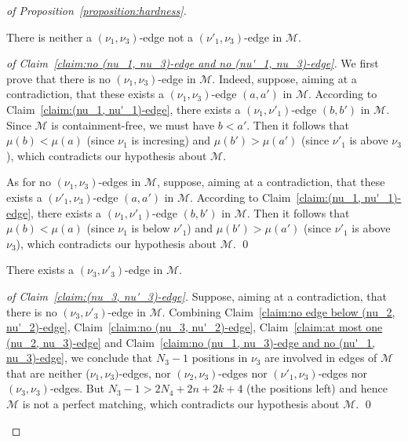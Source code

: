 \documentclass[a4paper]{llncs}
\begin{document}
\begin{proof}[of Proposition~\ref{proposition:hardness}]
  \begin{claim}
    \label{claim:no (nu_1, nu_3)-edge and no (nu'_1, nu_3)-edge}
    There is neither a $(\nu_1, \nu_3)$-edge not a $(\nu'_1, \nu_3)$-edge
    in $\mathcal{M}$.
  \end{claim}

 \begin{proof}[of Claim~\ref{claim:no (nu_1, nu_3)-edge and no (nu'_1, nu_3)-edge}]
    We first prove that there is no $(\nu_1, \nu_3)$-edge in $\mathcal{M}$.
    Indeed, suppose, aiming at a contradiction, that these exists
    a $(\nu_1, \nu_3)$-edge $(a, a')$ in $\mathcal{M}$.
    According to Claim~\ref{claim:(nu_1, nu'_1)-edge},
    there exists a $(\nu_1, \nu'_1)$-edge $(b, b')$ in $\mathcal{M}$.
    Since $\mathcal{M}$ is containment-free, we must have
    $b < a'$.
    Then it follows that
    $\mu(b) < \mu(a)$ (since $\nu_1$ is incresing) and
    $\mu(b') > \mu(a')$ (since $\nu'_1$ is above $\nu_3$),
    which contradicts our hypothesis about $\mathcal{M}$.

    As for no $(\nu_1, \nu_3)$-edges in $\mathcal{M}$, suppose,
    aiming at a contradiction, that these exists
    a $(\nu'_1, \nu_3)$-edge $(a, a')$ in $\mathcal{M}$.
    According to Claim~\ref{claim:(nu_1, nu'_1)-edge},
    there exists a $(\nu_1, \nu'_1)$-edge $(b, b')$ in $\mathcal{M}$.
    Then it follows that
    $\mu(b) < \mu(a)$ (since $\nu_1$ is below $\nu'_1$) and
    $\mu(b') > \mu(a')$ (since $\nu'_1$ is above $\nu_3$),
    which contradicts our hypothesis about $\mathcal{M}$.
    \qed
  \end{proof}

  \begin{claim}
    \label{claim:(nu_3, nu'_3)-edge}
    There exists a $(\nu_3, \nu'_3)$-edge in $\mathcal{M}$.
  \end{claim}

  \begin{proof}[of Claim~\ref{claim:(nu_3, nu'_3)-edge}]
    Suppose, aiming at a contradiction, that there is no
    $(\nu_3, \nu'_3)$-edge in $\mathcal{M}$.
    Combining
    Claim~\ref{claim:no edge below (nu_2, nu'_2)-edge},
    Claim~\ref{claim:no (nu_3, nu'_2)-edge},
    Claim~\ref{claim:at most one (nu_2, nu_3)-edge}
    and Claim~\ref{claim:no (nu_1, nu_3)-edge and no (nu'_1, nu_3)-edge},
    we conclude that $N_3-1$ positions in $\nu_3$ are involved
    in edges of $\mathcal{M}$ that are
    neither ($\nu_1, \nu_3)$-edges,
    nor $(\nu_2, \nu_3)$-edges
    nor $(\nu'_1, \nu_3)$-edges
    nor $(\nu_3, \nu_3)$-edges.
    But $N_3 - 1 > 2N_4 + 2n + 2k + 4$ (the positions left) and hence
    $\mathcal{M}$ is not a perfect matching,
    which contradicts our hypothesis about $\mathcal{M}$.
    \qed
  \end{proof}


\end{proof}
\end{document}
